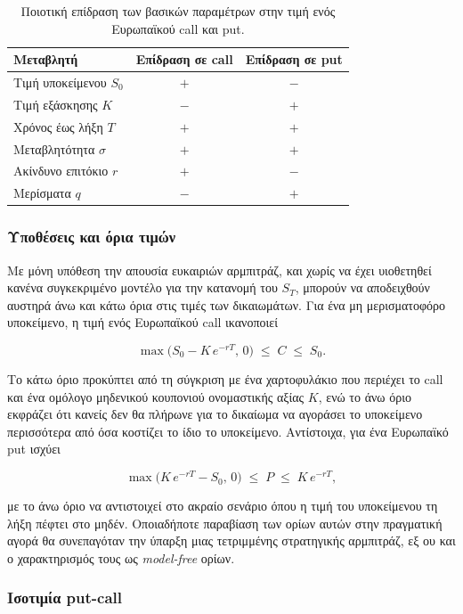 \documentclass[12pt]{article}
\begin{document}
\begin{table}[h]
\centering
\begin{tabular}{lcc}
\hline
Μεταβλητή & Επίδραση σε call & Επίδραση σε put \\ \hline
Τιμή υποκείμενου $S_0$    & $+$ & $-$ \\
Τιμή εξάσκησης $K$        & $-$ & $+$ \\
Χρόνος έως λήξη $T$       & $+$ & $+$ \\
Μεταβλητότητα $\sigma$    & $+$ & $+$ \\
Ακίνδυνο επιτόκιο $r$     & $+$ & $-$ \\
Μερίσματα $q$             & $-$ & $+$ \\ \hline
\end{tabular}
\caption{Ποιοτική επίδραση των βασικών παραμέτρων στην τιμή ενός Ευρωπαϊκού call και put.}
\label{tab:option_price_factors}
\end{table}

\subsubsection{Υποθέσεις και όρια τιμών}

Με μόνη υπόθεση την απουσία ευκαιριών αρμπιτράζ, και χωρίς να έχει υιοθετηθεί κανένα συγκεκριμένο μοντέλο για την κατανομή του $S_T$, μπορούν να αποδειχθούν αυστηρά άνω και κάτω όρια στις τιμές των δικαιωμάτων. Για ένα μη μερισματοφόρο υποκείμενο, η τιμή ενός Ευρωπαϊκού call ικανοποιεί

$$
\max\bigl(S_0 - K\,e^{-rT},\, 0\bigr) \;\leq\; C \;\leq\; S_0 .
$$

Το κάτω όριο προκύπτει από τη σύγκριση με ένα χαρτοφυλάκιο που περιέχει το call και ένα ομόλογο μηδενικού κουπονιού ονομαστικής αξίας $K$, ενώ το άνω όριο εκφράζει ότι κανείς δεν θα πλήρωνε για το δικαίωμα να αγοράσει το υποκείμενο περισσότερα από όσα κοστίζει το ίδιο το υποκείμενο. Αντίστοιχα, για ένα Ευρωπαϊκό put ισχύει

$$
\max\bigl(K\,e^{-rT} - S_0,\, 0\bigr) \;\leq\; P \;\leq\; K\,e^{-rT} ,
$$

με το άνω όριο να αντιστοιχεί στο ακραίο σενάριο όπου η τιμή του υποκείμενου τη λήξη πέφτει στο μηδέν. Οποιαδήποτε παραβίαση των ορίων αυτών στην πραγματική αγορά θα συνεπαγόταν την ύπαρξη μιας τετριμμένης στρατηγικής αρμπιτράζ, εξ ου και ο χαρακτηρισμός τους ως \emph{model-free} ορίων.

\subsubsection{Ισοτιμία put-call}
\end{document}
